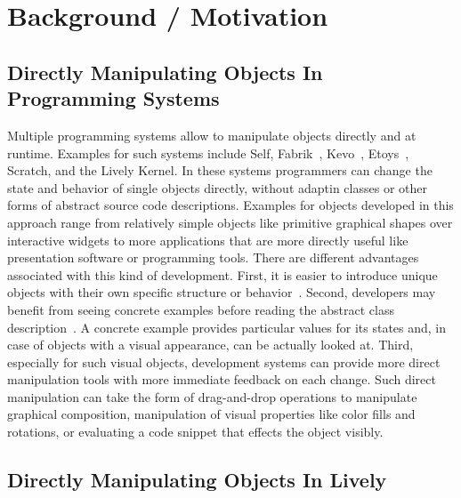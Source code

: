 \chapter{Background / Motivation} \label{sec:BACKGROUND}



\section{Directly Manipulating Objects In Programming Systems}

Multiple programming systems allow to manipulate objects directly and at runtime.
Examples for such systems include Self, Fabrik~\cite{Ingalls1988FVP}, Kevo~\cite{Tailvalsaari1992Kevo}, Etoys~\cite{Kay2005Etoys}, Scratch\cite{Maloney2010SPL}, and the Lively Kernel.
In these systems programmers can change the state and behavior of single objects directly, without adaptin classes or other forms of abstract source code descriptions. 
Examples for objects developed in this approach range from relatively simple objects like primitive graphical shapes over interactive widgets to more applications that are more directly useful like presentation software or programming tools.
There are different advantages associated with this kind of development.
First, it is easier to introduce unique objects with their own specific structure or behavior~. 
Second, developers may benefit from seeing concrete examples before reading the abstract class description~.
A concrete example provides particular values for its states and, in case of objects with a visual appearance, can be actually looked at.
Third, especially for such visual objects, development systems can provide more direct manipulation tools with more immediate feedback on each change.
Such direct manipulation can take the form of drag-and-drop operations to manipulate graphical composition, manipulation of visual properties like color fills and rotations, or evaluating a code snippet that effects the object visibly.



\section{Directly Manipulating Objects In Lively}

